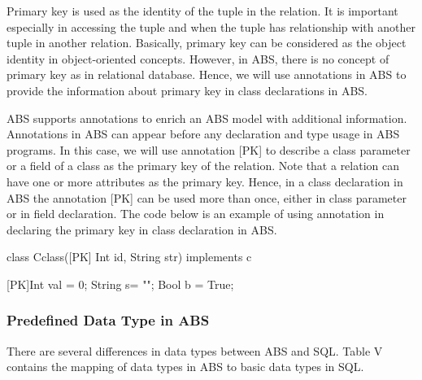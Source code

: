\documentclass[conference]{IEEEtran}
\begin{document}
Primary key is used as the identity of the tuple in the relation. It is important especially in accessing the tuple and when the tuple has relationship with another tuple in another relation. Basically, primary key can be considered as the object identity in object-oriented concepts. However, in ABS, there is no concept of primary key as in relational database. Hence, we will use annotations in ABS to provide the information about primary key in class declarations in ABS.

ABS supports annotations to enrich an ABS model with additional information. Annotations in ABS can appear before any declaration and type usage in ABS programs. In this case, we will use annotation [PK] to describe a class parameter or a field of a class as the primary key of the relation. Note that a relation can have one or more attributes as the primary key. Hence, in a class declaration in ABS the annotation [PK] can be used more than once, either in class parameter or in field declaration. The code below is an example of using annotation in declaring the primary key in class declaration in ABS.

\begin{abscode}
class Cclass([PK] Int id, String str) implements c{

  [PK]Int val = 0;
  String s= "";
  Bool b = True;

}
\end{abscode}

\subsubsection{Predefined Data Type in ABS}
There are several differences in data types between ABS and SQL. Table V contains the mapping of data types in ABS to basic data types in SQL.
\end{document}
